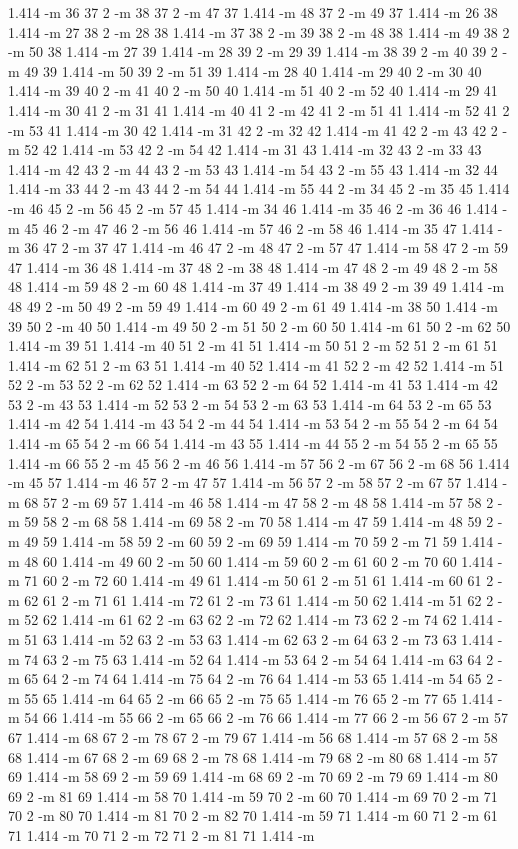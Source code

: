 \documentclass[12pt]{article}
\begin{document}
1.414 -m 36 37 2 -m 38 37 2 -m 47 37 1.414 -m 48 37 2 -m 49 37 1.414 -m 26 38 1.414 -m 27 38 2 -m 28 38 1.414 -m 37 38 2 -m 39 38 2 -m 48 38 1.414 -m 49 38 2 -m 50 38 1.414 -m 27 39 1.414 -m 28 39 2 -m 29 39 1.414 -m 38 39 2 -m 40 39 2 -m 49 39 1.414 -m 50 39 2 -m 51 39 1.414 -m 28 40 1.414 -m 29 40 2 -m 30 40 1.414 -m 39 40 2 -m 41 40 2 -m 50 40 1.414 -m 51 40 2 -m 52 40 1.414 -m 29 41 1.414 -m 30 41 2 -m 31 41 1.414 -m 40 41 2 -m 42 41 2 -m 51 41 1.414 -m 52 41 2 -m 53 41 1.414 -m 30 42 1.414 -m 31 42 2 -m 32 42 1.414 -m 41 42 2 -m 43 42 2 -m 52 42 1.414 -m 53 42 2 -m 54 42 1.414 -m 31 43 1.414 -m 32 43 2 -m 33 43 1.414 -m 42 43 2 -m 44 43 2 -m 53 43 1.414 -m 54 43 2 -m 55 43 1.414 -m 32 44 1.414 -m 33 44 2 -m 43 44 2 -m 54 44 1.414 -m 55 44 2 -m 34 45 2 -m 35 45 1.414 -m 46 45 2 -m 56 45 2 -m 57 45 1.414 -m 34 46 1.414 -m 35 46 2 -m 36 46 1.414 -m 45 46 2 -m 47 46 2 -m 56 46 1.414 -m 57 46 2 -m 58 46 1.414 -m 35 47 1.414 -m 36 47 2 -m 37 47 1.414 -m 46 47 2 -m 48 47 2 -m 57 47 1.414 -m 58 47 2 -m 59 47 1.414 -m 36 48 1.414 -m 37 48 2 -m 38 48 1.414 -m 47 48 2 -m 49 48 2 -m 58 48 1.414 -m 59 48 2 -m 60 48 1.414 -m 37 49 1.414 -m 38 49 2 -m 39 49 1.414 -m 48 49 2 -m 50 49 2 -m 59 49 1.414 -m 60 49 2 -m 61 49 1.414 -m 38 50 1.414 -m 39 50 2 -m 40 50 1.414 -m 49 50 2 -m 51 50 2 -m 60 50 1.414 -m 61 50 2 -m 62 50 1.414 -m 39 51 1.414 -m 40 51 2 -m 41 51 1.414 -m 50 51 2 -m 52 51 2 -m 61 51 1.414 -m 62 51 2 -m 63 51 1.414 -m 40 52 1.414 -m 41 52 2 -m 42 52 1.414 -m 51 52 2 -m 53 52 2 -m 62 52 1.414 -m 63 52 2 -m 64 52 1.414 -m 41 53 1.414 -m 42 53 2 -m 43 53 1.414 -m 52 53 2 -m 54 53 2 -m 63 53 1.414 -m 64 53 2 -m 65 53 1.414 -m 42 54 1.414 -m 43 54 2 -m 44 54 1.414 -m 53 54 2 -m 55 54 2 -m 64 54 1.414 -m 65 54 2 -m 66 54 1.414 -m 43 55 1.414 -m 44 55 2 -m 54 55 2 -m 65 55 1.414 -m 66 55 2 -m 45 56 2 -m 46 56 1.414 -m 57 56 2 -m 67 56 2 -m 68 56 1.414 -m 45 57 1.414 -m 46 57 2 -m 47 57 1.414 -m 56 57 2 -m 58 57 2 -m 67 57 1.414 -m 68 57 2 -m 69 57 1.414 -m 46 58 1.414 -m 47 58 2 -m 48 58 1.414 -m 57 58 2 -m 59 58 2 -m 68 58 1.414 -m 69 58 2 -m 70 58 1.414 -m 47 59 1.414 -m 48 59 2 -m 49 59 1.414 -m 58 59 2 -m 60 59 2 -m 69 59 1.414 -m 70 59 2 -m 71 59 1.414 -m 48 60 1.414 -m 49 60 2 -m 50 60 1.414 -m 59 60 2 -m 61 60 2 -m 70 60 1.414 -m 71 60 2 -m 72 60 1.414 -m 49 61 1.414 -m 50 61 2 -m 51 61 1.414 -m 60 61 2 -m 62 61 2 -m 71 61 1.414 -m 72 61 2 -m 73 61 1.414 -m 50 62 1.414 -m 51 62 2 -m 52 62 1.414 -m 61 62 2 -m 63 62 2 -m 72 62 1.414 -m 73 62 2 -m 74 62 1.414 -m 51 63 1.414 -m 52 63 2 -m 53 63 1.414 -m 62 63 2 -m 64 63 2 -m 73 63 1.414 -m 74 63 2 -m 75 63 1.414 -m 52 64 1.414 -m 53 64 2 -m 54 64 1.414 -m 63 64 2 -m 65 64 2 -m 74 64 1.414 -m 75 64 2 -m 76 64 1.414 -m 53 65 1.414 -m 54 65 2 -m 55 65 1.414 -m 64 65 2 -m 66 65 2 -m 75 65 1.414 -m 76 65 2 -m 77 65 1.414 -m 54 66 1.414 -m 55 66 2 -m 65 66 2 -m 76 66 1.414 -m 77 66 2 -m 56 67 2 -m 57 67 1.414 -m 68 67 2 -m 78 67 2 -m 79 67 1.414 -m 56 68 1.414 -m 57 68 2 -m 58 68 1.414 -m 67 68 2 -m 69 68 2 -m 78 68 1.414 -m 79 68 2 -m 80 68 1.414 -m 57 69 1.414 -m 58 69 2 -m 59 69 1.414 -m 68 69 2 -m 70 69 2 -m 79 69 1.414 -m 80 69 2 -m 81 69 1.414 -m 58 70 1.414 -m 59 70 2 -m 60 70 1.414 -m 69 70 2 -m 71 70 2 -m 80 70 1.414 -m 81 70 2 -m 82 70 1.414 -m 59 71 1.414 -m 60 71 2 -m 61 71 1.414 -m 70 71 2 -m 72 71 2 -m 81 71 1.414 -m 
\end{document}
